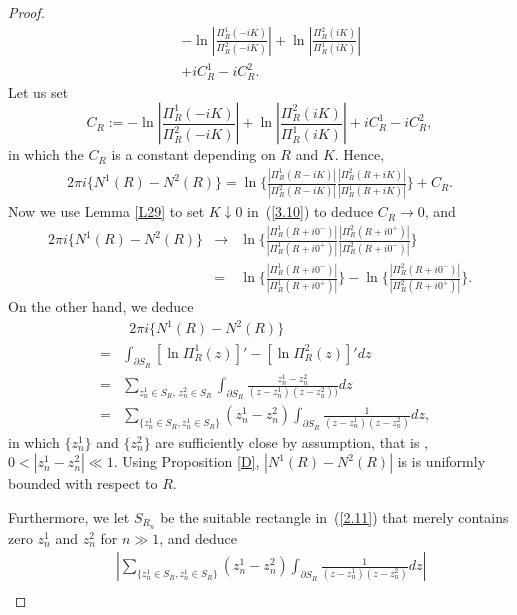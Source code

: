\documentclass[10pt,a4paper]{article}
\theoremstyle{plain}
\theoremstyle{definition}
\theoremstyle{remark}
\numberwithin{equation}{section}
\begin{document}
\begin{proof}
\begin{eqnarray*}
&&-\ln|\frac{\Pi_{R}^{1}(-iK)}{\Pi_{R}^{2}(-iK)}|+\ln|\frac{\Pi_{R}^{2}(iK)}{\Pi_{R}^{1}(iK)}|\\
&&+iC_{R}^{1}-iC_{R}^{2}.
\end{eqnarray*}
Let us set $$C_{R}:=-\ln|\frac{\Pi_{R}^{1}(-iK)}{\Pi_{R}^{2}(-iK)}|+\ln|\frac{\Pi_{R}^{2}(iK)}{\Pi_{R}^{1}(iK)}|+iC_{R}^{1}-iC_{R}^{2},$$
in which the $C_{R}$ is a constant depending on $R$ and $K$.
Hence,
\begin{eqnarray}\label{3.10}
2\pi i\{ N^{1}(R)-N^{2}(R)\}=\ln\{\frac{|\Pi_{R}^{1}(R-iK)|}{|\Pi_{R}^{2}(R-iK)|}\frac{|\Pi_{R}^{2}(R+iK)|}{|\Pi_{R}^{1}(R+iK)|}\}+C_{R}.
\end{eqnarray}
Now we use Lemma \ref{L29} to set $K\downarrow0$ in~(\ref{3.10}) to deduce $C_{R}\rightarrow0$, and
\begin{eqnarray}
2\pi i\{ N^{1}(R)-N^{2}(R)\}&\rightarrow&\ln\{\frac{|\Pi_{R}^{1}(R+i0^{-})|}{|\Pi_{R}^{1}(R+i0^{+})|}\frac{|\Pi_{R}^{2}(R+i0^{+})|}{|\Pi_{R}^{2}(R+i0^{-})|}\}\\
&=&\ln\{\frac{|\Pi_{R}^{1}(R+i0^{-})|}{|\Pi_{R}^{1}(R+i0^{+})|}\}-\ln\{\frac{|\Pi_{R}^{2}(R+i0^{-})|}{|\Pi_{R}^{2}(R+i0^{+})|}\}.\label{3.12}
\end{eqnarray}
On the other hand, we deduce
\begin{eqnarray}\nonumber
&&\hspace{6pt}2\pi i \{N^{1}(R)-N^{2}(R)\}\\\nonumber
&=&\int_{\partial S_{R}}[\ln\Pi^{1}_{R}(z)]'-[\ln\Pi^{2}_{R}(z)]'dz\\\nonumber
&=&\sum_{z^{1}_{n}\in S_{R},\,z^{2}_{n}\in S_{R}}\int_{\partial S_{R}}\frac{z_{n}^{1}-z_{n}^{2}}{(z-z_{n}^{1})(z-z_{n}^{2}))}dz\\\nonumber
&=&\sum_{\{{z^{1}_{n}\in S_{R}},{z^{1}_{n}\in S_{R}}\}}(z_{n}^{1}-z_{n}^{2}) \int_{\partial S_{R}}\frac{1}{(z-z_{n}^{1})(z-z_{n}^{2})}dz,
\end{eqnarray}
in which $\{z_{n}^{1}\}$ and $\{z_{n}^{2}\}$ are sufficiently close by assumption, that is , $0<|z_{n}^{1}-z_{n}^{2}|\ll1$. 
Using Proposition \ref{D},  $|N^{1}(R)-N^{2}(R)|$ is is uniformly bounded with respect to $R$.
\par
Furthermore, we let $S_{R_{n}}$ be the suitable rectangle in~(\ref{2.11}) that merely contains zero $z_{n}^{1}$ and $z_{n}^{2}$ for $n\gg1$, and deduce 
\begin{eqnarray*}
&&|\sum_{\{{z^{1}_{n}\in S_{R}},{z^{1}_{n}\in S_{R}}\}}(z_{n}^{1}-z_{n}^{2})\int_{\partial S_{R}}\frac{1}{(z-z_{n}^{1})(z-z_{n}^{2})}dz|\\

\end{eqnarray*}
\end{proof}
\end{document}
